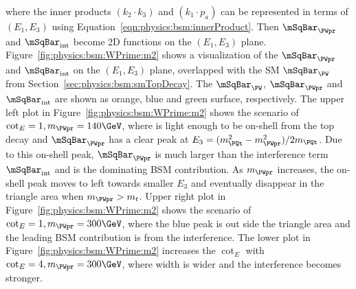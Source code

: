 \noindent where the inner products $(  k_2 \cdot k_3)$ and $ (  k_1 \cdot p_a) $ can be represented in terms of $(E_1,E_3)$ using Equation~\ref{eqn:physics:bsm:innerProduct}. Then $\mSqBar _{\PWpr} $ and $\mSqBar _{\mathrm{int}}$ become 2D functions on the $(E_1,E_3)$ plane.  Figure~\ref{fig:physics:bsm:WPrime:m2} shows a visualization of the $\mSqBar _{\PWpr} $ and $\mSqBar _{\mathrm{int}}$ on the $(E_1,E_3)$ plane, overlapped with the SM $\mSqBar _{\PW}$ from Section~\ref{sec:physics:bsm:smTopDecay}. The $\mSqBar _{\PW}$, $\mSqBar _{\PWpr} $ and $\mSqBar _{\mathrm{int}}$ are shown as orange, blue and green surface, respectively. The upper left plot in Figure~\ref{fig:physics:bsm:WPrime:m2} shows the scenario of $\cot_E=1, m_{\PWpr}=140\GeV$, where \PWpr is light enough to be on-shell from the top decay and  $\mSqBar _{\PWpr} $ has a clear peak at $E_3 = (m^2_\PQt - m^2_{\PWpr})/2 m_\PQt $. Due to this on-shell peak,  $\mSqBar _{\PWpr} $ is much larger than the interference term  $\mSqBar _{\mathrm{int}}$  and is the dominating BSM contribution. As $m_{\PWpr}$ increases, the on-shell \PWpr peak moves to left towards smaller $E_3$ and eventually disappear in the triangle area when $m_{\PWpr} > m_{t}$. Upper right plot in Figure~\ref{fig:physics:bsm:WPrime:m2} shows the scenario of $\cot_E=1, m_{\PWpr}=300 \GeV$, where the blue peak is out side the triangle area and the leading BSM contribution is from the interference. The lower plot in Figure~\ref{fig:physics:bsm:WPrime:m2} increases the $\cot_E$  with $\cot_E=4, m_{\PWpr}=300 \GeV$, where \PWpr width is wider and the interference becomes stronger. 





